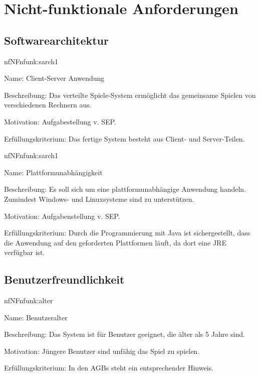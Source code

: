 \chapter{Nicht-funktionale Anforderungen}

\setcounter{nf}{10}

\section{Softwarearchitektur}

\begin{description}[leftmargin=5em, style=sameline]	
	\begin{lhp}{nf}{NF}{nfunk:sarch1}
		\item [Name:] Client-Server Anwendung
		\item [Beschreibung:] Das verteilte Spiele-System ermöglicht das gemeinsame Spielen von verschiedenen Rechnern aus.
		\item [Motivation:] Aufgabestellung v. SEP.
		\item [Erfüllungskriterium:] Das fertige System besteht aus Client- und Server-Teilen.
	\end{lhp}
	
	\begin{lhp}{nf}{NF}{nfunk:sarch1}
		\item [Name:] Plattformunabhängigkeit
		\item [Beschreibung:] Es soll sich um eine plattformunabhängige Anwendung handeln. Zumindest Windows- und Linuxsysteme sind zu unterstützen.
		\item [Motivation:] Aufgabenstellung v. SEP.
		\item [Erfüllungskriterium:] Durch die Programmierung mit Java ist sichergestellt, dass die Anwendung auf den geforderten Plattformen läuft, da dort eine JRE verfügbar ist.
	\end{lhp}
\end{description}



\section{Benutzerfreundlichkeit}


\begin{description}[leftmargin=5em, style=sameline]	
	\begin{lhp}{nf}{NF}{nfunk:alter}
		\item [Name:] Benutzeralter
		\item [Beschreibung:] Das System ist für Benutzer geeignet, die älter als 5 Jahre sind.
		\item [Motivation:] Jüngere Benutzer sind unfähig das Spiel zu spielen.
		\item [Erfüllungskriterium:] In den AGBs steht ein entsprechender Hinweis.
	\end{lhp}
\end{description}

